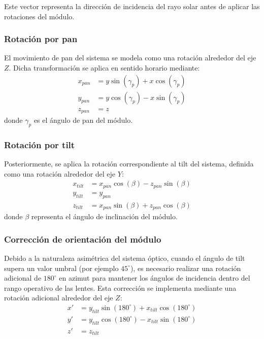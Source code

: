 Este vector representa la dirección de incidencia del rayo solar antes de aplicar las rotaciones del módulo.

\subsubsection{Rotación por pan}

El movimiento de pan del sistema se modela como una rotación alrededor del eje $Z$. Dicha transformación se aplica en sentido horario mediante:
\begin{equation}
	\begin{aligned}
		x_{pan} &= y\sin(\gamma_p) + x\cos(\gamma_p) \\
		y_{pan} &= y\cos(\gamma_p) - x\sin(\gamma_p) \\
		z_{pan} &= z
	\end{aligned}
\end{equation}
donde $\gamma_p$ es el ángulo de pan del módulo.

\subsubsection{Rotación por tilt}

Posteriormente, se aplica la rotación correspondiente al tilt del sistema, definida como una rotación alrededor del eje $Y$:
\begin{equation}
	\begin{aligned}
		x_{tilt} &= x_{pan}\cos(\beta) - z_{pan}\sin(\beta) \\
		y_{tilt} &= y_{pan} \\
		z_{tilt} &= x_{pan}\sin(\beta) + z_{pan}\cos(\beta)
	\end{aligned}
\end{equation}
donde $\beta$ representa el ángulo de inclinación del módulo.

\subsubsection{Corrección de orientación del módulo}

Debido a la naturaleza asimétrica del sistema óptico, cuando el ángulo de tilt supera un valor umbral (por ejemplo $45^\circ$), es necesario realizar una rotación adicional de $180^\circ$ en azimut para mantener los ángulos de incidencia dentro del rango operativo de las lentes. Esta corrección se implementa mediante una rotación adicional alrededor del eje $Z$:
\begin{equation}
	\begin{aligned}
		x' &= y_{tilt}\sin(180^\circ) + x_{tilt}\cos(180^\circ) \\
		y' &= y_{tilt}\cos(180^\circ) - x_{tilt}\sin(180^\circ) \\
		z' &= z_{tilt}
	\end{aligned}
\end{equation}

